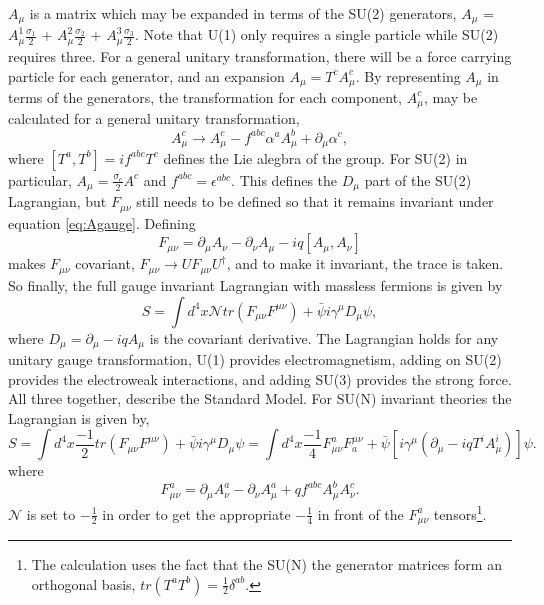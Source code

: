 $A_\mu$ is a matrix which may be expanded in terms of the SU(2) generators, $A_\mu$ = $A^1_{\mu}\frac{\sigma_1}{2}$ + $A^2_{\mu}\frac{\sigma_2}{2}$ + $A^3_{\mu}\frac{\sigma_3}{2}$. Note that U(1) only requires a single particle while SU(2) requires three. For a general unitary transformation, there will be a force carrying particle for each generator, and an expansion $A_\mu = T^cA^c_\mu$. By representing $A_\mu$ in terms of the generators, the transformation for each component, $A^c_\mu$, may be calculated for a general unitary transformation, 
\begin{equation}
\label{eq:Agauge}
A^c_\mu \rightarrow A^c_\mu - f^{abc}\alpha^a A^b_\mu + \partial_\mu\alpha^c, 
\end{equation}
where $[T^a,T^b]=if^{abc}T^c$ defines the Lie alegbra of the group. For SU(2) in particular, $A_\mu = \frac{\sigma_c}{2}A^c$ and $f^{abc} = \epsilon^{abc}$.
This defines the $D_\mu$ part of the SU(2) Lagrangian, but $F_{\mu\nu}$ still needs to be defined so that it remains invariant under equation \ref{eq:Agauge}. Defining 
\begin{equation}
F_{\mu\nu} = \partial_\mu A_\nu - \partial_\nu A_\mu - iq[A_\mu,A_\nu] 
\end{equation}
makes $F_{\mu\nu}$ covariant, $F_{\mu\nu} \rightarrow UF_{\mu\nu}U^\dagger$, and to make it invariant, the trace is taken. So finally, the full gauge invariant Lagrangian with massless fermions is given by
\begin{equation}
S = \int d^4x \mathcal{N}tr(F_{\mu\nu}F^{\mu\nu}) + \bar{\psi}i\gamma^\mu D_\mu\psi,
\end{equation}
where $D_\mu = \partial_\mu - iqA_\mu$ is the covariant derivative. The Lagrangian holds for any unitary gauge transformation, U(1) provides electromagnetism, adding on SU(2) provides the electroweak interactions, and adding SU(3) provides the strong force. All three together, describe the Standard Model. For SU(N) invariant theories the Lagrangian is given by, 
\begin{equation}
\label{eq:ewlagrangian}
S = \int d^4x \frac{-1}{2}tr(F_{\mu\nu}F^{\mu\nu}) + \bar{\psi}i\gamma^\mu D_\mu\psi 
  = \int d^4x \frac{-1}{4}F^a_{\mu\nu}F_a^{\mu\nu} + \bar{\psi}\left[i\gamma^\mu\left(\partial_\mu - iqT^iA^i_\mu\right)\right]\psi. 
\end{equation}
where
\begin{equation}
F^a_{\mu\nu} = \partial_\mu A^a_\nu - \partial_\nu A^a_\mu + qf^{abc}A^b_\mu A^c_\nu. 
\end{equation}
$\mathcal{N}$ is set to $-\frac{1}{2}$ in order to get the appropriate $-\frac{1}{4}$ in front of the $F^a_{\mu\nu}$ tensors\footnote{The calculation uses the fact that the SU(N) the generator matrices form an orthogonal basis, $tr(T^aT^b) = \frac{1}{2}\delta^{ab}$.}.

